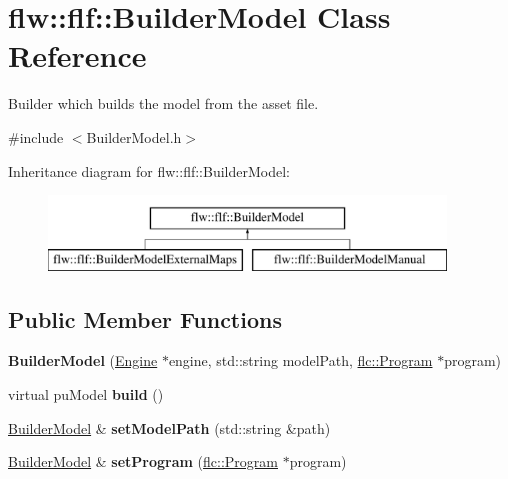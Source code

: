 \hypertarget{classflw_1_1flf_1_1BuilderModel}{}\section{flw\+:\+:flf\+:\+:Builder\+Model Class Reference}
\label{classflw_1_1flf_1_1BuilderModel}


Builder which builds the model from the asset file.  




{\ttfamily \#include $<$Builder\+Model.\+h$>$}

Inheritance diagram for flw\+:\+:flf\+:\+:Builder\+Model\+:\begin{figure}[H]
\begin{center}
\leavevmode
\includegraphics[height=2.000000cm]{classflw_1_1flf_1_1BuilderModel}
\end{center}
\end{figure}
\subsection*{Public Member Functions}
\begin{DoxyCompactItemize}
\item 
\mbox{\label{classflw_1_1flf_1_1BuilderModel_a2bdb7cf2baa8140b6a7fe9de8f178ccf}} 
{\bfseries Builder\+Model} (\hyperlink{classflw_1_1Engine}{Engine} $\ast$engine, std\+::string model\+Path, \hyperlink{classflw_1_1flc_1_1Program}{flc\+::\+Program} $\ast$program)
\item 
\mbox{\label{classflw_1_1flf_1_1BuilderModel_ab5ec429a3559b7b4f0aff98980106805}} 
virtual pu\+Model {\bfseries build} ()
\item 
\mbox{\label{classflw_1_1flf_1_1BuilderModel_a049974f188c679dbf4ef514ccad13f68}} 
\hyperlink{classflw_1_1flf_1_1BuilderModel}{Builder\+Model} \& {\bfseries set\+Model\+Path} (std\+::string \&path)
\item 
\mbox{\label{classflw_1_1flf_1_1BuilderModel_a274c0199bf3197984efe7847a4d2052c}} 
\hyperlink{classflw_1_1flf_1_1BuilderModel}{Builder\+Model} \& {\bfseries set\+Program} (\hyperlink{classflw_1_1flc_1_1Program}{flc\+::\+Program} $\ast$program)
\end{DoxyCompactItemize}
